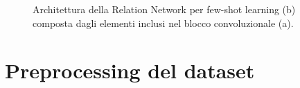 \documentclass[12pt,a4paper,titlepage]{article}
\begin{document}
\begin{figure}[h]
	\centering
	\qquad
	\label{fig:relation_network_architecture}	
	\caption{Architettura della Relation Network per few-shot learning (b) composta dagli elementi inclusi nel blocco convoluzionale (a).~\cite{DBLP:journals/corr/abs-1711-06025}}
\end{figure}

\clearpage

\section{Preprocessing del dataset}
\label{sec:preprocessing_dataset}
\end{document}
